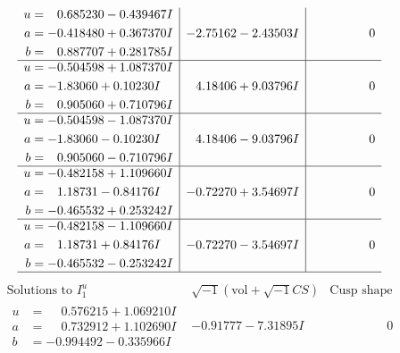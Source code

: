 \documentclass[1p]{elsarticle_modified}
\theoremstyle{definition}
\newcommand{\I}{\sqrt{-1}}
\begin{document}
$$\begin{array}{c|c|c}
\begin{aligned}
u &= \phantom{-}0.685230 - 0.439467 I \\
a &= -0.418480 + 0.367370 I \\
b &= \phantom{-}0.887707 + 0.281785 I\end{aligned}
 & -2.75162 - 2.43503 I & \phantom{-0.000000 } 0 \\ \hline\begin{aligned}
u &= -0.504598 + 1.087370 I \\
a &= -1.83060 + 0.10230 I \\
b &= \phantom{-}0.905060 + 0.710796 I\end{aligned}
 & \phantom{-}4.18406 + 9.03796 I & \phantom{-0.000000 } 0 \\ \hline\begin{aligned}
u &= -0.504598 - 1.087370 I \\
a &= -1.83060 - 0.10230 I \\
b &= \phantom{-}0.905060 - 0.710796 I\end{aligned}
 & \phantom{-}4.18406 - 9.03796 I & \phantom{-0.000000 } 0 \\ \hline\begin{aligned}
u &= -0.482158 + 1.109660 I \\
a &= \phantom{-}1.18731 - 0.84176 I \\
b &= -0.465532 + 0.253242 I\end{aligned}
 & -0.72270 + 3.54697 I & \phantom{-0.000000 } 0 \\ \hline\begin{aligned}
u &= -0.482158 - 1.109660 I \\
a &= \phantom{-}1.18731 + 0.84176 I \\
b &= -0.465532 - 0.253242 I\end{aligned}
 & -0.72270 - 3.54697 I & \phantom{-0.000000 } 0\\
 \hline 
 \end{array}$$\newpage$$\begin{array}{c|c|c}  
\text{Solutions to }I^u_{1}& \I (\text{vol} + \sqrt{-1}CS) & \text{Cusp shape}\\
 \hline 
\begin{aligned}
u &= \phantom{-}0.576215 + 1.069210 I \\
a &= \phantom{-}0.732912 + 1.102690 I \\
b &= -0.994492 - 0.335966 I\end{aligned}
 & -0.91777 - 7.31895 I & \phantom{-0.000000 } 0 \\ \hline\begin{aligned}

\end{aligned}
\end{array}$$
\end{document}
